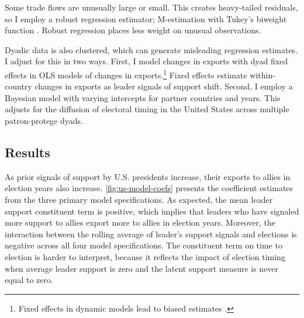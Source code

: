\documentclass[12pt]{article}
\begin{document}
Some trade flows are unusually large or small. 
This creates heavy-tailed residuals, so I employ a robust regression estimator; M-estimation with Tukey's biweight function \citep{RaineyBaissa2020}.
Robust regression places less weight on unusual observations. 


Dyadic data is also clustered, which can generate misleading regression estimates.
I adjust for this in two ways. 
First, I model changes in exports with dyad fixed effects in OLS models of changes in exports.\footnote{Fixed effects in dynamic models lead to biased estimates \citep{Nickell1981}.}
Fixed effects estimate within-country changes in exports as leader signals of support shift.
Second, I employ a Bayesian model with varying intercepts for partner countries and years. 
This adjusts for the diffusion of electoral timing in the United States across multiple patron-protege dyads.




\subsection{Results}


As prior signals of support by U.S. presidents increase, their exports to allies in election years also increase. 
\autoref{fig:us-model-coefs} presents the coefficient estimates from the three primary model specifications.
As expected, the mean leader support constituent term is positive, which implies that leaders who have signaled more support to allies export more to allies in election years. 
Moreover, the interaction between the rolling average of leader's support signals and elections is negative across all four model specifications.
The constituent term on time to election is harder to interpret, because it reflects the impact of election timing when average leader support is zero and the latent support measure is never equal to zero. 
\end{document}

